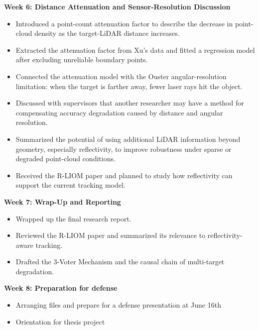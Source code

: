 \documentclass[11pt,a4paper]{report}
\newcommand{\boxitemtitle}[1]{
    \vspace{0.5em}
    {\large\textbf{\color{DeepBlue} #1}}\par
    \vspace{0.8em}
}
\begin{document}
\boxitemtitle{Week 6: Distance Attenuation and Sensor-Resolution Discussion}
\begin{contentbox}
    \begin{itemize}[leftmargin=*, nosep]
        \item Introduced a point-count attenuation factor to describe the decrease in point-cloud density as the target-LiDAR distance increases.
        \item Extracted the attenuation factor from Xu's data and fitted a regression model after excluding unreliable boundary points.
        \item Connected the attenuation model with the Ouster angular-resolution limitation: when the target is farther away, fewer laser rays hit the object.
        \item Discussed with supervisors that another researcher may have a method for compensating accuracy degradation caused by distance and angular resolution.
        \item Summarized the potential of using additional LiDAR information beyond geometry, especially reflectivity, to improve robustness under sparse or degraded point-cloud conditions.
        \item Received the R-LIOM paper and planned to study how reflectivity can support the current tracking model.
    \end{itemize}
\end{contentbox}

\boxitemtitle{Week 7: Wrap-Up and Reporting}
\begin{contentbox}
    \begin{itemize}[leftmargin=*, nosep]
        \item Wrapped up the final research report.
        \item Reviewed the R-LIOM paper and summarized its relevance to reflectivity-aware tracking.
        \item Drafted the 3-Voter Mechanism and the causal chain of multi-target degradation.
    \end{itemize}
\end{contentbox}

\boxitemtitle{Week 8: Preparation for defense}
\begin{contentbox}
    \begin{itemize}[leftmargin=*, nosep]
        \item Arranging files and prepare for a defense presentation at June 16th
        \item Orientation for thesis project
    \end{itemize}
\end{contentbox}

\newpage
\newpage
{}


\end{document}
